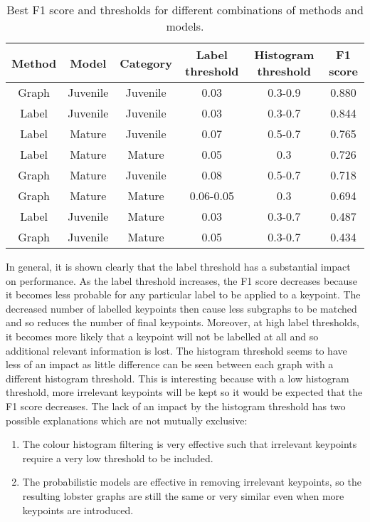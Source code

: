 \begin{table}[H]
\centering
\begin{tabular}{| c | c | c | c | c | c |}
\hline
\textbf{Method} & \textbf{Model} & \textbf{Category} & \textbf{Label threshold} & \textbf{Histogram threshold} & \textbf{F1 score} \\ 
\hline
Graph & Juvenile & Juvenile & 0.03 & 0.3-0.9 & 0.880 \\
\hline
Label & Juvenile & Juvenile & 0.03 & 0.3-0.7 & 0.844 \\
\hline
Label & Mature & Juvenile & 0.07 & 0.5-0.7 & 0.765 \\
\hline
Label & Mature & Mature & 0.05 & 0.3 & 0.726 \\
\hline
Graph & Mature & Juvenile & 0.08 & 0.5-0.7 & 0.718 \\
\hline
Graph & Mature & Mature & 0.06-0.05 & 0.3 & 0.694 \\
\hline
Label & Juvenile & Mature & 0.03 & 0.3-0.7 & 0.487 \\
\hline
Graph & Juvenile & Mature & 0.05 & 0.3-0.7 & 0.434 \\
\hline
\end{tabular}
\caption{Best F1 score and thresholds for different combinations of methods and models.}
\end{table}
\noindent
In general, it is shown clearly that the label threshold has a substantial impact on performance. As the label threshold increases, the F1 score decreases because it becomes less probable for any particular label to be applied to a keypoint. The decreased number of labelled keypoints then cause less subgraphs to be matched and so reduces the number of final keypoints. Moreover, at high label thresholds, it becomes more likely that a keypoint will not be labelled at all and so additional relevant information is lost. 
\n
The histogram threshold seems to have less of an impact as little difference can be seen between each graph with a different histogram threshold. This is interesting because with a low histogram threshold, more irrelevant keypoints will be kept so it would be expected that the F1 score decreases. The lack of an impact by the histogram threshold has two possible explanations which are not mutually exclusive:
\begin{enumerate}
\item The colour histogram filtering is very effective such that irrelevant keypoints require a very low threshold to be included. 
\item The probabilistic models are effective in removing irrelevant keypoints, so the resulting lobster graphs are still the same or very similar even when more keypoints are introduced. 
\end{enumerate}
